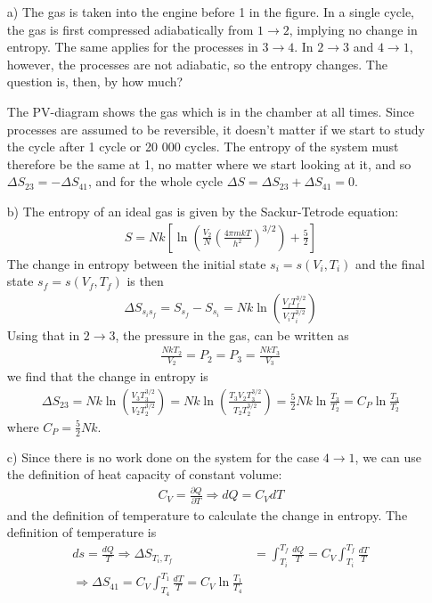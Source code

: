 \documentclass[11pt]{article}
\newcounter{excount}
\newenvironment{exercise}[1][]{\addtocounter{excount}{1} \noindent {\bf Exercise
    \arabic{excount} #1}\hspace{2mm}}{\vspace{4mm}}
\begin{document}
\begin{exercise}
	\begin{itemize}
		\item[a)]
			The gas is taken into the engine before 1 in the figure. In a single cycle, the gas is first compressed adiabatically from $1\rightarrow 2$, implying no change in entropy. The same applies for the processes in $3\rightarrow 4$. In $2\rightarrow 3$ and $4\rightarrow 1$, however, the processes are not adiabatic, so the entropy changes. The question is, then, by how much?

			The PV-diagram shows the gas which is in the chamber at all times. Since processes are assumed to be reversible, it doesn't matter if we start to study the cycle after 1 cycle or 20 000 cycles. The entropy of the system must therefore be the same at 1, no matter where we start looking at it, and so $\Delta S_{23} = -\Delta S_{41}$, and for the whole cycle $\Delta S = \Delta S_{23} + \Delta S_{41} = 0$.			
		
		
		\item[b)]
			The entropy of an ideal gas is given by the Sackur-Tetrode equation:
			\begin{align*}
				S = Nk\left[ \ln \left( \frac{V_2}{N} \left( \frac{4\pi mk T}{h^2} \right) ^{3/2} \right) + \frac{5}{2} \right]
			\end{align*}
			The change in entropy between the initial state $s_i=s(V_i, T_i)$ and the final state $s_f=s(V_f, T_f)$ is then
			\begin{align}
				\Delta S_{s_i s_f} = S_{s_f} - S_{s_i} = Nk\ln \left( \frac{V_f T_f^{3/2}}{V_i T_i^{3/2}} \right) \label{delta S si sf}
			\end{align}
			Using that in $2\rightarrow 3$, the pressure in the gas, can be written as
			\begin{align*}
				\frac{NkT_2}{V_2} = P_2 = P_3 = \frac{NkT_3}{V_3}
			\end{align*}
			we find that the change in entropy is
			\begin{align*}
				\Delta S_{23} = Nk\ln \left( \frac{V_3 T_3^{3/2}}{V_2T_2^{3/2}} \right) = Nk\ln \left( \frac{T_3V_2 T_3^{3/2}}{T_2 T_2^{3/2}} \right)  = \frac{5}{2}Nk\ln\frac{T_3}{T_2} = C_P\ln \frac{T_3}{T_2}
			\end{align*}
			where $C_P = \frac{5}{2}Nk$.
		
		\item[c)]
			Since there is no work done on the system for the case $4\rightarrow 1$, we can use the definition of heat capacity of constant volume:
			\begin{align}
				C_V = \frac{\partial Q}{\partial T} \Rightarrow dQ = C_V dT \label{eq: heat capacity constant volume}
			\end{align}
			and the definition of temperature to calculate the change in entropy. The definition of temperature is
			\begin{align*}
				ds = \frac{dQ}{T} \Rightarrow \Delta S_{T_i, T_f} &= \int_{T_i}^{T_f} \frac{dQ}{T} = C_V \int_{T_i}^{T_f} \frac{dT}{T} \\
				\Rightarrow \Delta S_{41} = C_V \int_{T_4}^{T_1} \frac{dT}{T} = C_V \ln \frac{T_1}{T_4}
			\end{align*}
		

\end{itemize}
\end{exercise}
\end{document}
